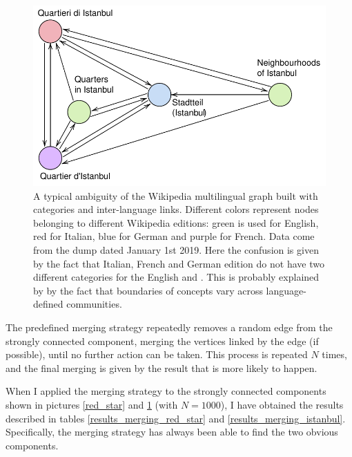             \begin{figure}
                \centering
                \includegraphics[width=\textwidth]{images/istanbul.pdf}
                \caption{A typical ambiguity of the Wikipedia multilingual graph built with categories and inter-language links. Different colors represent nodes belonging to different Wikipedia editions: green is used for English, red for Italian, blue for German and purple for French. Data come from the dump dated January 1st 2019. Here the confusion is given by the fact that Italian, French and German edition do not have two different categories for the English  and . This is probably explained by by the fact that boundaries of concepts vary across language-defined communities.}
                \label{istanbul}
            \end{figure}
        
            The predefined merging strategy repeatedly removes a random edge from the strongly connected component, merging the vertices linked by the edge (if possible), until no further action can be taken. This process is repeated \(N\) times, and the final merging is given by the result that is more likely to happen.
        
            When I applied the merging strategy to the strongly connected components shown in pictures \ref{red_star} and \ref{istanbul} (with \(N = 1000\)), I have obtained the results described in tables \ref{results_merging_red_star} and \ref{results_merging_istanbul}. Specifically, the merging strategy has always been able to find the two obvious components.
        
